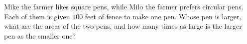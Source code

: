 Mike the farmer likes square pens, while Milo the farmer prefers circular pens. Each of them is given $100$ feet of fence to make one pen. Whose pen is larger, what are the areas of the two pens, and how many times as large is the larger pen as the smaller one?
